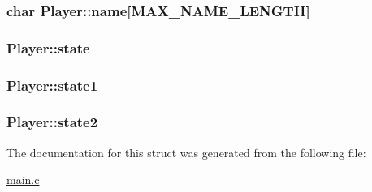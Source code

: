 \subsubsection[{\texorpdfstring{name}{name}}]{\setlength{\rightskip}{0pt plus 5cm}char Player\+::name\mbox{[}{\bf M\+A\+X\+\_\+\+N\+A\+M\+E\+\_\+\+L\+E\+N\+G\+TH}\mbox{]}}\hypertarget{structPlayer_a000f74f4241ebc344866c82bec4ed5ef}{}\label{structPlayer_a000f74f4241ebc344866c82bec4ed5ef}
\subsubsection[{\texorpdfstring{state}{state}}]{ Player\+::state}\hypertarget{structPlayer_ac4a623bf6650a719187c50bb0413b9a0}{}\label{structPlayer_ac4a623bf6650a719187c50bb0413b9a0}
\subsubsection[{\texorpdfstring{state1}{state1}}]{ Player\+::state1}\hypertarget{structPlayer_a7712ad6df23e875de18fb38537620909}{}\label{structPlayer_a7712ad6df23e875de18fb38537620909}
\subsubsection[{\texorpdfstring{state2}{state2}}]{ Player\+::state2}\hypertarget{structPlayer_a7b894c51bb7a740af4a2ffef56a4e788}{}\label{structPlayer_a7b894c51bb7a740af4a2ffef56a4e788}


The documentation for this struct was generated from the following file\+:\begin{DoxyCompactItemize}
\item 
\hyperlink{main_8c}{main.\+c}\end{DoxyCompactItemize}
